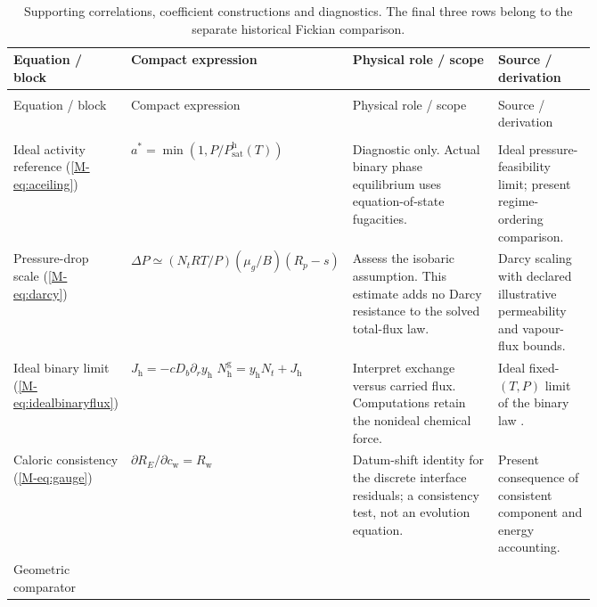 \begin{longtable}{@{}>{\raggedright\arraybackslash}p{0.14\linewidth}
>{\raggedright\arraybackslash}p{0.37\linewidth}
>{\raggedright\arraybackslash}p{0.25\linewidth}
>{\raggedright\arraybackslash}p{}@{}}
\caption{Supporting correlations, coefficient constructions and diagnostics.
The final three rows belong to the separate historical Fickian comparison.}
\label{tab:equations:support}\\
\toprule
Equation / block & Compact expression & Physical role / scope & Source / derivation\\\midrule
\endfirsthead
\multicolumn{4}{l}{\tablename~\thetable\ (continued)}\\
\toprule
Equation / block & Compact expression & Physical role / scope & Source / derivation\\\midrule
\endhead
\midrule\multicolumn{4}{r}{Continued on next page}\\\endfoot
\bottomrule\endlastfoot
Ideal activity reference\newline
(\ref*{M-eq:aceiling})
& $a^*=\min(1,P/P_{\mathrm{sat}}^{\mathrm h}(T))$
& Diagnostic only. Actual binary phase equilibrium uses equation-of-state fugacities.
& Ideal pressure-feasibility limit; present regime-ordering comparison.\\[5pt]
Pressure-drop scale\newline
(\ref*{M-eq:darcy})
& $\Delta P\simeq(N_tRT/P)(\mu_g/B)(R_p-s)$
& Assess the isobaric assumption. This estimate adds no Darcy resistance to the solved total-flux law.
& Darcy scaling with declared illustrative permeability and vapour-flux bounds.\\[5pt]
Ideal binary limit\newline
(\ref*{M-eq:idealbinaryflux})
& $J_{\mathrm h}=-cD_b\partial_r y_{\mathrm h}$\newline
  $N_{\mathrm h}^{\mathrm g}=y_{\mathrm h}N_t+J_{\mathrm h}$
& Interpret exchange versus carried flux. Computations retain the nonideal chemical force.
& Ideal fixed-$(T,P)$ limit of the binary law \citep{krishna1997maxwell}.\\[5pt]
Caloric consistency\newline
(\ref*{M-eq:gauge})
& $\partial R_E/\partial c_{\mathrm w}=R_{\mathrm w}$
& Datum-shift identity for the discrete interface residuals; a consistency test, not an evolution equation.
& Present consequence of consistent component and energy accounting.\\[5pt]
Geometric comparator\newline

\end{longtable}
